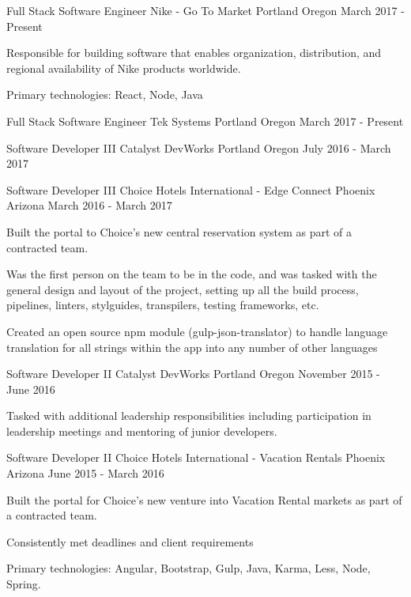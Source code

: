 
\begin{cventries}

  \cventry
  {Full Stack Software Engineer}
  {Nike - Go To Market}
  {Portland Oregon}
  {March 2017 - Present}
  {
    \begin{cvitems}
      \item {Responsible for building software that enables organization, distribution, and regional availability of Nike products worldwide.}
      \item {Primary technologies: React, Node, Java}
    \end{cvitems}
  }

  \cventry
  {Full Stack Software Engineer}
  {Tek Systems}
  {Portland Oregon}
  {March 2017 - Present}
  {}

  \cventry
  {Software Developer III}
  {Catalyst DevWorks}
  {Portland Oregon}
  {July 2016 - March 2017}
  {}

  \cventry
    {Software Developer III}
    {Choice Hotels International - Edge Connect}
    {Phoenix Arizona}
    {March 2016 - March 2017}
    {
      \begin{cvitems}
        \item {Built the portal to Choice's new central reservation system as part of a contracted team.}
        \item {Was the first person on the team to be in the code, and was tasked with the general design and layout of the project, setting up all the build process, pipelines, linters, stylguides, transpilers, testing frameworks, etc.}
        \item {Created an open source npm module (gulp-json-translator) to handle language translation for all strings within the app into any number of other languages}
      \end{cvitems}
    }

  \cventry
    {Software Developer II}
    {Catalyst DevWorks}
    {Portland Oregon}
    {November 2015 - June 2016}
    {
      \begin{cvitems}
        \item {Tasked with additional leadership responsibilities including participation in leadership meetings and mentoring of junior developers.}
      \end{cvitems}
    }

  \cventry
    {Software Developer II}
    {Choice Hotels International - Vacation Rentals}
    {Phoenix Arizona}
    {June 2015 - March 2016}
    {
      \begin{cvitems}
        \item {Built the portal for Choice's new venture into Vacation Rental markets as part of a contracted team.}
        \item {Consistently met deadlines and client requirements}
        \item {Primary technologies: Angular, Bootstrap, Gulp, Java, Karma, Less, Node, Spring.}
      \end{cvitems}
    }


\end{cventries}
